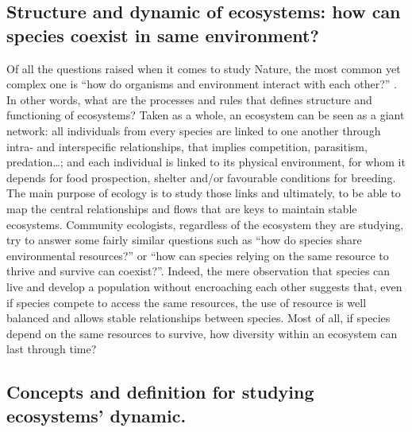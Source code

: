 

\subsection{Structure and dynamic of ecosystems: how can species coexist in same environment?} 

Of all the questions raised when it comes to study Nature, the most common yet complex one is “how do organisms and environment interact with each other?” \citep{sutherland2013}. In other words, what are the processes and rules that defines structure and functioning of ecosystems? Taken as a whole, an ecosystem can be seen as a giant network: all individuals from every species are linked to one another through intra- and interspecific relationships, that implies competition, parasitism, predation…; and each individual is linked to its physical environment, for whom it depends for food prospection, shelter and/or favourable conditions for breeding. The main purpose of ecology is to study those links and ultimately, to be able to map the central relationships and flows that are keys to maintain stable ecosystems.  Community ecologists, regardless of the ecosystem they are studying, try to answer some fairly similar questions such as “how do species share environmental resources?” or “how can species relying on the same resource to thrive and survive can coexist?”. Indeed, the mere observation that species can live and develop a population without encroaching each other suggests that, even if species compete to access the same resources, the use of resource is well balanced and allows stable relationships between species. Most of all, if species depend on the same resources to survive, how diversity within an ecosystem can last through time?

\subsection{Concepts and definition for studying ecosystems’ dynamic.}
 
